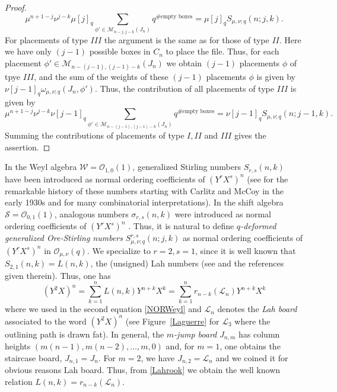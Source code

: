 \documentclass[10pt]{amsart}
\begin{document}
\begin{proof}
$$
\mu^{n+1-j}\nu^{j-k}\mu [j]_q \sum_{\phi' \in \mathcal{M}_{n-j,j-k}(J_{n})} q^{\# \mbox{empty boxes}} = \mu [j]_q S_{\mu,\nu;q}(n;j,k).
$$
For placements of type $III$ the argument is the same as for those of type $II$. Here we have only $(j-1)$ possible boxes in $C_n$ to place the file. Thus, for each placement $\phi' \in \mathcal{M}_{n-(j-1),(j-1)-k}(J_{n})$ we obtain $(j-1)$ placements $\phi$ of tpye $III$, and the sum of the weights of these $(j-1)$ placements $\phi$ is given by $\nu [j-1]_q \omega_{\mu,\nu;q}(J_n,\phi')$. Thus, the contribution of all placements of type $III$ is given by
$$
\mu^{n+1-j}\nu^{j-k} \nu [j-1]_q \sum_{\phi' \in \mathcal{M}_{n-(j-1),(j-1)-k}(J_{n})} q^{\# \mbox{empty boxes}} = \nu [j-1]_q S_{\mu,\nu;q}(n;j-1,k).
$$
 Summing the contributions of placements of type $I,II$ and $III$ gives the assertion.
\end{proof}

In the Weyl algebra ${\mathcal W}={\mathcal O}_{1,0}(1)$, generalized Stirling numbers $S_{r,s}(n,k)$ have been introduced as normal ordering coefficients of $(Y^rX^s)^n$ (see \cite{TMMS2016} for the remarkable history of these numbers starting with Carlitz \cite{LC1930,LC1932} and McCoy \cite{Coy1934} in the early 1930s and \cite{BLFL2011} for many combinatorial interpretations). In the shift algebra ${\mathcal S}={\mathcal O}_{0,1}(1)$, analogous numbers $\sigma_{r,s}(n,k)$ were introduced as normal ordering coefficients of $(Y^rX^s)^n$ \cite{MS2022}. Thus, it is natural to define {\em $q$-deformed generalized Ore-Stirling numbers} $S_{\mu,\nu;q}^{r,s}(n;j,k)$ as normal ordering coefficients of  $(Y^rX^s)^n$ in ${\mathcal O}_{\mu,\nu}(q)$. We specialize to $r=2,s=1$, since it is well known that $S_{2,1}(n,k)=L(n,k)$, the (unsigned) Lah numbers (see \cite{TMMS2016} and the references given therein). Thus, one has 
\begin{equation}\label{Lahrook}
(Y^2X)^n=\sum_{k=1}^n L(n,k) Y^{n+k}X^k=\sum_{k=1}^n r_{n-k}({\mathcal L}_n) Y^{n+k}X^k
\end{equation}
where we used in the second equation \eqref{NORWeyl} and ${\mathcal L}_n$ denotes the {\em Lah board} associated to the word $(Y^2X)^n$ (see Figure~\ref{Laguerre} for ${\mathcal L}_3$ where the outlining path is drawn fat). In general, the {\em $m$-jump board} $J_{n,m}$ has column heights $(m(n-1),m(n-2),\ldots,m,0)$ \cite{JGJH2000} and, for $m=1$, one obtains the staircase board, $J_{n,1}=J_n$. For $m=2$, we have $J_{n,2}={\mathcal L}_n$ and we coined it for obvious reasons Lah board. Thus, from \eqref{Lahrook} we obtain the well known relation $L(n,k)= r_{n-k}({\mathcal L}_n)$. 
\end{document}
